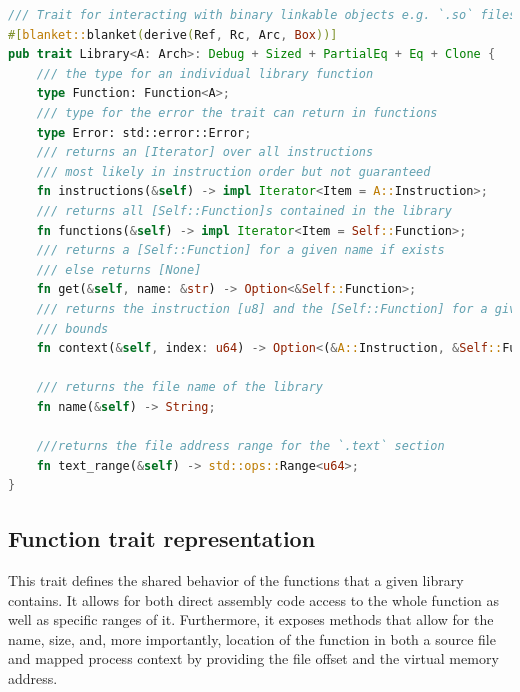 \begin{lstlisting}[caption=\label{lst:library}{The Library Trait definition}, language=Rust]
/// Trait for interacting with binary linkable objects e.g. `.so` files
#[blanket::blanket(derive(Ref, Rc, Arc, Box))]
pub trait Library<A: Arch>: Debug + Sized + PartialEq + Eq + Clone {
    /// the type for an individual library function
    type Function: Function<A>;
    /// type for the error the trait can return in functions
    type Error: std::error::Error;
    /// returns an [Iterator] over all instructions
    /// most likely in instruction order but not guaranteed
    fn instructions(&self) -> impl Iterator<Item = A::Instruction>;
    /// returns all [Self::Function]s contained in the library
    fn functions(&self) -> impl Iterator<Item = Self::Function>;
    /// returns a [Self::Function] for a given name if exists
    /// else returns [None]
    fn get(&self, name: &str) -> Option<&Self::Function>;
    /// returns the instruction [u8] and the [Self::Function] for a given index if inside library
    /// bounds
    fn context(&self, index: u64) -> Option<(&A::Instruction, &Self::Function)>;

    /// returns the file name of the library
    fn name(&self) -> String;

    ///returns the file address range for the `.text` section
    fn text_range(&self) -> std::ops::Range<u64>;
}
\end{lstlisting}

    \subsection{Function trait representation}
    \label{reader:function}

    This trait defines the shared behavior of the functions that a given library contains.
    It allows for both direct assembly code access to the whole function as well as specific ranges of it.
    Furthermore, it exposes methods that allow for the name, size, and, more importantly, location of the function in both a source file and mapped process context by providing the file offset and the virtual memory address.

